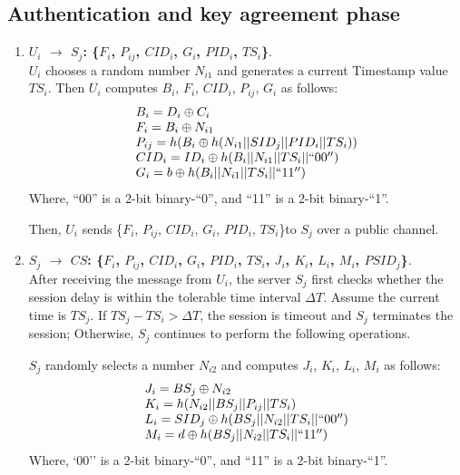 \documentclass[preprint,12pt]{elsarticle}
\begin{document}
\subsection{Authentication and key agreement phase}
\begin{enumerate}[Step 1:]
\item \textbf{$U_i$ $\rightarrow$ $S_j$: \{$F_i$, $P_{ij}$, $CID_i$, $G_i$, $PID_i$, $TS_i$\}}.\\
$U_i$ chooses a random number $N_{i1}$ and generates a current Timestamp value $TS_i$. Then $U_i$ computes $B_i$, $F_i$, $CID_i$, $P_{ij}$, $G_i$ as follows:
\begin{eqnarray}
\left.\begin{array}{l}
B_i=D_i\oplus C_i\\
F_i=B_i\oplus N_{i1}\\
P_{ij}=h(B_i\oplus h(N_{i1}||SID_j||PID_i||TS_i))\\
CID_i=ID_i\oplus h(B_i||N_{i1}||TS_i||``00'')\\
G_i=b\oplus h(B_i||N_{i1}||TS_i||``11'')
\end{array} \right.
\end{eqnarray}
Where, ``00'' is a 2-bit binary-``0'', and ``11'' is a 2-bit binary-``1''.

Then, $U_i$ sends \{$F_i$, $P_{ij}$, $CID_i$, $G_i$, $PID_i$, $TS_i$\}to $S_j$ over a public channel.

\item \textbf{$S_j$ $\rightarrow$ $CS$: \{$F_i$, $P_{ij}$, $CID_i$, $G_i$, $PID_i$, $TS_i$, $J_i$, $K_i$, $L_i$, $M_i$, $PSID_j$\}}.\\
After receiving the message from $U_i$, the server $S_j$ first checks whether the session delay is within the tolerable time interval $\Delta T$. Assume the current time is $TS_j$. If $TS_j-TS_i> \Delta T$, the session is timeout and $S_j$ terminates the session; Otherwise, $S_j$ continues to perform the following operations.

$S_j$ randomly selects a number $N_{i2}$ and computes $J_i$, $K_i$, $L_i$, $M_i$ as follows:
\begin{eqnarray}
\left.\begin{array}{l}
J_i=BS_j\oplus N_{i2}\\
K_i=h(N_{i2}||BS_j||P_{ij}||TS_i)\\
L_i=SID_j\oplus h(BS_j||N_{i2}||TS_i||``00'')\\
M_i=d\oplus h(BS_j||N_{i2}||TS_i||``11'')
\end{array} \right.
\end{eqnarray}
Where, `00'' is a 2-bit binary-``0'', and ``11'' is a 2-bit binary-``1''.


\end{enumerate}
\end{document}
